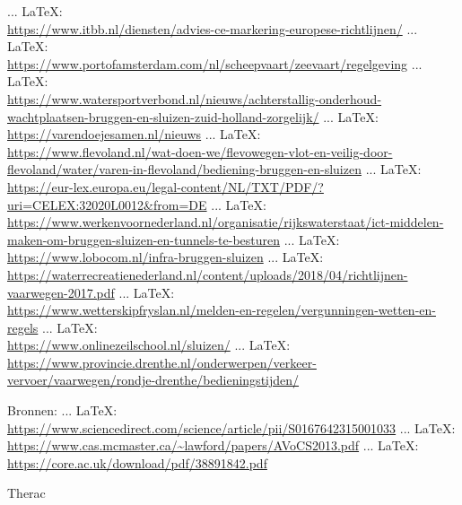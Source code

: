 \begin{thebibliography}{99}
{{{{ ... \LaTeX:\\ \url{https://www.itbb.nl/diensten/advies-ce-markering-europese-richtlijnen/}
 ... \LaTeX:\\ \url{https://www.portofamsterdam.com/nl/scheepvaart/zeevaart/regelgeving}
 ... \LaTeX:\\ \url{https://www.watersportverbond.nl/nieuws/achterstallig-onderhoud-wachtplaatsen-bruggen-en-sluizen-zuid-holland-zorgelijk/}
 ... \LaTeX:\\ \url{https://varendoejesamen.nl/nieuws}
 ... \LaTeX:\\ \url{https://www.flevoland.nl/wat-doen-we/flevowegen-vlot-en-veilig-door-flevoland/water/varen-in-flevoland/bediening-bruggen-en-sluizen}
 ... \LaTeX:\\ \url{https://eur-lex.europa.eu/legal-content/NL/TXT/PDF/?uri=CELEX:32020L0012&from=DE}
 ... \LaTeX:\\ \url{https://www.werkenvoornederland.nl/organisatie/rijkswaterstaat/ict-middelen-maken-om-bruggen-sluizen-en-tunnels-te-besturen}
 ... \LaTeX:\\ \url{https://www.lobocom.nl/infra-bruggen-sluizen}
 ... \LaTeX:\\ \url{https://waterrecreatienederland.nl/content/uploads/2018/04/richtlijnen-vaarwegen-2017.pdf}
 ... \LaTeX:\\ \url{https://www.wetterskipfryslan.nl/melden-en-regelen/vergunningen-wetten-en-regels}
 ... \LaTeX:\\ \url{https://www.onlinezeilschool.nl/sluizen/}
 ... \LaTeX:\\ \url{https://www.provincie.drenthe.nl/onderwerpen/verkeer-vervoer/vaarwegen/rondje-drenthe/bedieningstijden/}





Bronnen:
 ... \LaTeX:\\ \url{https://www.sciencedirect.com/science/article/pii/S0167642315001033}
 ... \LaTeX:\\ \url{https://www.cas.mcmaster.ca/~lawford/papers/AVoCS2013.pdf}
 ... \LaTeX:\\ \url{https://core.ac.uk/download/pdf/38891842.pdf}

Therac


}}}}
\end{thebibliography}
